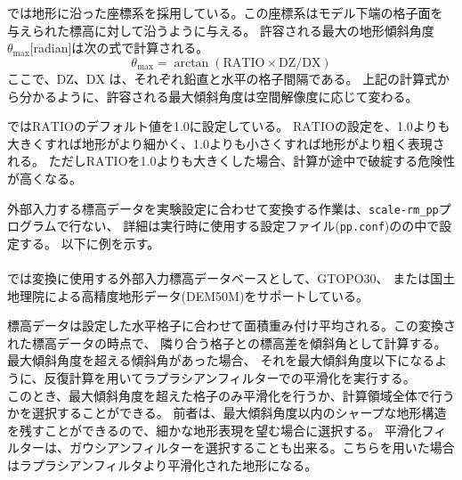 \section{\SecBasicTopoSetting} \label{subsec:basic_usel_topo}

\scalerm では地形に沿った座標系を採用している。この座標系はモデル下端の格子面を
与えられた標高に対して沿うように与える。
許容される最大の地形傾斜角度$\theta_{\max}$[radian]は次の式で計算される。
\[
  \theta_{\max} = \arctan( \mathrm{RATIO} \times \mathrm{DZ}/\mathrm{DX} )
\]
ここで、$\mathrm{DZ}$、$\mathrm{DX}$ は、それぞれ鉛直と水平の格子間隔である。
上記の計算式から分かるように、許容される最大傾斜角度は空間解像度に応じて変わる。

\scalerm では$\mathrm{RATIO}$のデフォルト値を1.0に設定している。
$\mathrm{RATIO}$の設定を、1.0よりも大きくすれば地形がより細かく、1.0よりも小さくすれば地形がより粗く表現される。
ただし$\mathrm{RATIO}$を1.0よりも大きくした場合、計算が途中で破綻する危険性が高くなる。

外部入力する標高データを実験設定に合わせて変換する作業は、\verb|scale-rm_pp|プログラムで行ない、
詳細は実行時に使用する設定ファイル(\verb|pp.conf|)のの中で設定する。
以下に例を示す。\\

\\

\scalerm では変換に使用する外部入力標高データベースとして、GTOPO30、
または国土地理院による高精度地形データ(DEM50M)をサポートしている。


標高データは設定した水平格子に合わせて面積重み付け平均される。この変換された標高データの時点で、
隣り合う格子との標高差を傾斜角として計算する。最大傾斜角度を超える傾斜角があった場合、
それを最大傾斜角度以下になるように、反復計算を用いてラプラシアンフィルターでの平滑化を実行する。\\
このとき、最大傾斜角度を超えた格子のみ平滑化を行うか、計算領域全体で行うかを選択することができる。
前者は、最大傾斜角度以内のシャープな地形構造を残すことができるので、細かな地形表現を望む場合に選択する。
平滑化フィルターは、ガウシアンフィルターを選択することも出来る。こちらを用いた場合はラプラシアンフィルタより平滑化された地形になる。


